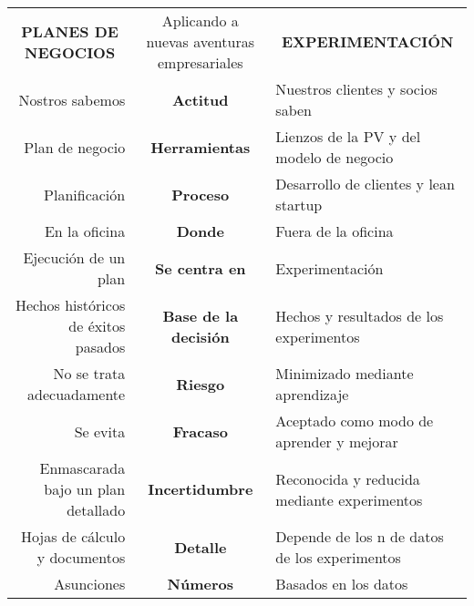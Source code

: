 \documentclass[11pt]{book}
\begin{document}
\begin{table}[htbp]
  \centering

    \begin{tabular}{rcl}
    \multicolumn{1}{c}{\textbf{PLANES DE NEGOCIOS}} & \multicolumn{1}{p{7.715em}}{Aplicando a nuevas aventuras empresariales} & \multicolumn{1}{c}{\textbf{EXPERIMENTACIÓN}} \\
    Nostros sabemos & \textbf{Actitud} & Nuestros clientes y socios saben \\
    Plan de negocio & \textbf{Herramientas} & Lienzos de la PV y del modelo de negocio \\
    Planificación & \textbf{Proceso} & Desarrollo de clientes y lean startup \\
    En la oficina & \textbf{Donde} & Fuera de la oficina \\
    Ejecución de un plan & \textbf{Se centra en } & Experimentación \\
    Hechos históricos de éxitos pasados & \textbf{Base de la decisión} & Hechos y resultados de los experimentos \\
    No se trata adecuadamente & \textbf{Riesgo} & Minimizado mediante aprendizaje \\
    Se evita & \textbf{Fracaso} & Aceptado como modo de aprender y mejorar \\
    Enmascarada bajo un plan detallado & \textbf{Incertidumbre} & Reconocida y reducida mediante experimentos \\
    Hojas de cálculo y documentos & \textbf{Detalle} & Depende de los n de datos de los experimentos \\
    Asunciones & \textbf{Números} & Basados en los datos \\
    \end{tabular}%
  \label{tab:addlabel}%
\end{table}%
\vspace{5cm}
\end{document}
